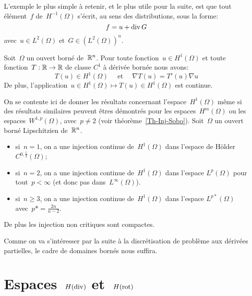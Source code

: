 \medskip
L'exemple le plus simple à retenir, et le plus utile pour la suite, est que tout élément~$f$ de~$H^{-1}(\Omega)$ s'écrit, au sens des distributions, sous la forme:
\begin{equation}\colorred
f = u + \dive G
\end{equation}
avec~$u \in L^2(\Omega)$ et~$G \in (L^2(\Omega))^n$.
\medskip
\begin{theoreme}
Soit~$\Omega$ un ouvert borné de~$\mathbb R^n$.
Pour toute fonction~$u \in H^1(\Omega)$ et toute fonction~$T: \mathbb R \to \mathbb R$ de classe $C^1$ à dérivée bornée nous avons:
\begin{equation}
T(u) \in H^1(\Omega)\quad\text{ et }\quad\nabla T(u) = T'(u)\nabla u
\end{equation}
De plus, l'application~$u \in H^1(\Omega) \mapsto T(u) \in H^1(\Omega)$ est continue.
\end{theoreme}
\medskip
On se contente ici de donner les résultats concernant l'espace~$H^1(\Omega)$ même si des résultats similaires peuvent êtres démontrés pour les espaces~$H^m(\Omega)$ ou les espaces~$W^{1,p}(\Omega)$, avec~$p\ne 2$ (voir théorème~\ref{Th-Inj-Sobo}).
Soit~$\Omega$ un ouvert borné Lipschitzien de~$\mathbb R^n$.
\begin{itemize}
  \item si~$n=1$, on a une injection continue de~$H^1(\Omega)$ dans l'espace de Hölder~$C^{0,\frac12}(\Omega)$;
  \item si~$n=2$, on a une injection continue de~$H^1(\Omega)$ dans l'espace $L^p(\Omega)$ pour tout~$p<\infty$ (et donc pas dans~$L^\infty(\Omega)$).
  \item si~$n\ge 3$, on a une injection continue de~$H^1(\Omega)$ dans l'espace $L^{p*}(\Omega)$ avec~$p*=\frac{2n}{n-2}$.
\end{itemize}
De plus les injection non critiques sont compactes.

Comme on va s'intéresser par la suite à la discrétisation de problème aux dérivées partielles, le cadre de domaines bornés nous suffira.

\medskip%
\section{Espaces~$H(\operatorname{div})$ et~$H(\operatorname{rot})$}

